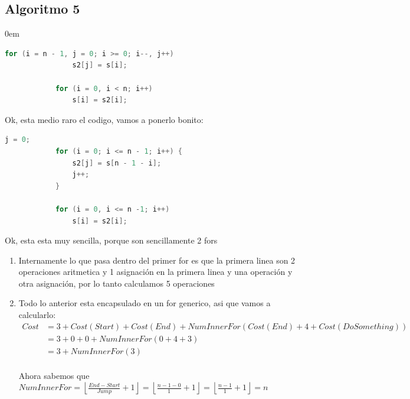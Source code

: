 \documentclass[12pt, fleqn]{article}                            %
\newenvironment{SmallIndentation}[1][0.75em]                    %
        {\begin{adjustwidth}{#1}{}\begin{footnotesize}}             %
        {\end{footnotesize}\end{adjustwidth}}                       %
\theoremstyle{break}                                            %
\newcommand{\Floor}[1]{\left \lfloor #1 \right \rfloor}         %
\begin{document}
    \subsection{Algoritmo 5}
    \begin{SmallIndentation}[0em]
            
        \begin{lstlisting}[language=C, gobble=12, basicstyle=\small\color{white}]
            for (i = n - 1, j = 0; i >= 0; i--, j++)
                s2[j] = s[i];

            for (i = 0, i < n; i++)
                s[i] = s2[i];
        \end{lstlisting}

        Ok, esta medio raro el codigo, vamos a ponerlo bonito:
        \begin{lstlisting}[language=C, gobble=12, basicstyle=\small\color{white}]
            j = 0;
            for (i = 0; i <= n - 1; i++) {
                s2[j] = s[n - 1 - i];
                j++;
            }

            for (i = 0, i <= n -1; i++)
                s[i] = s2[i];
        \end{lstlisting}

        Ok, esta esta muy sencilla, porque son sencillamente 2 fors

        \begin{enumerate}

            \item
                Internamente lo que pasa dentro del primer for es que la primera
                linea son 2 operaciones aritmetica y 1 asignación en la primera
                linea y una operación y otra asignación, por lo tanto calculamos
                5 operaciones

            \item Todo lo anterior esta encapsulado en un for generico, 
                asi que vamos a calcularlo:
                \begin{align*}
                    Cost 
                        &= 3 + Cost(Start) + Cost(End) + NumInnerFor(Cost(End) + 4 + Cost(DoSomething))     \\
                        &= 3 + 0 + 0 + NumInnerFor(0 + 4 + 3)     \\
                        &= 3 + NumInnerFor(3)     \\
                \end{align*}

                Ahora sabemos que 
                $NumInnerFor 
                    = \Floor{\frac{End - Start}{Jump} + 1}
                    = \Floor{\frac{n - 1- 0}{1} + 1}
                    = \Floor{\frac{n-1}{1} + 1}
                    = n$


\end{enumerate}
\end{SmallIndentation}
\end{document}
